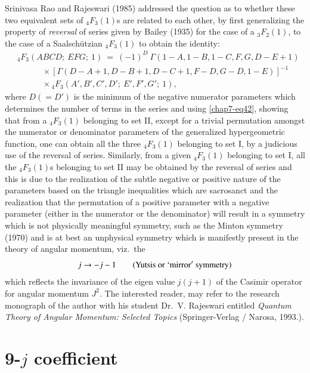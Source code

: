 Srinivasa Rao and Rajeswari (1985) addressed the question as to whether these two equivalent sets of $_4F_3(1)$s are related to each other, by first generalizing the property of \textit{reversal} of series given by Bailey (1935) for the case of a $_3F_2(1)$, to the case of a Saalschützian $_4F_3(1)$ to obtain the identity:
\begin{equation}
\begin{split}
& {}_4F_3(ABCD;\ EFG;\ 1)\ =\ (-1)^D\ \Gamma(1-A,1-B,1-C,F,G,D-E+1)\\
& \qquad\quad\times [\Gamma(D-A+1, D-B+1, D-C+1, F-D, G-D, 1-E)]^{-1}\\
& \qquad\quad\times {}_4F_3(A',B',C',D';\ E',F',G';\ 1), \label{chap7-eq42}
\end{split}
\end{equation}
where $D(=D')$ is the minimum of the negative numerator parameters which determines the number of terms in the series and using \eqref{chap7-eq42}, showing that from a $_4F_3(1)$ belonging to set II, except for a trivial permutation amongst the numerator or denominator parameters of the generalized hypergeometric function, one can obtain all the three $_4F_3(1)$ belonging to set I, by a judicious use of the reversal of series. Similarly, from a given $_4F_3(1)$ belonging to set I, all the $_4F_3(1)$s belonging to set II may be obtained by the reversal of series and this is due to the realization of the subtle negative or positive nature of the parameters based on the triangle inequalities which are sacrosanct and the realization that the permutation of a positive parameter with a negative parameter (either in the numerator or the denominator) will result in a symmetry which is not physically meaningful symmetry, such as the Minton symmetry (1970) and is at best an unphysical symmetry which is manifestly present in the theory of angular momentum, viz.\ the
\begin{equation} 
j\rightarrow -j-1 \qquad ({\rm Yutsis\ or\ `mirror'\ symmetry}) \label{chap7-eq43}
\end{equation}
which reflects the invariance of the eigen value $j(j+1)$ of the Casimir operator for angular momentum $J^2$. The interested reader, may refer to the research monograph of the author with his student Dr.\ V. Rajeswari entitled \textit{Quantum Theory of Angular Momentum: Selected Topics} (Springer-Verlag / Narosa, 1993.).

\section*{9-$j$ coefficient}

